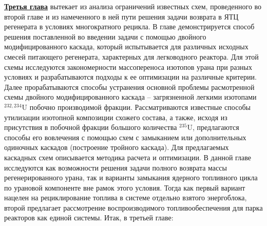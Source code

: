\underline{\textbf{Третья глава}} вытекает из анализа ограничений известных схем, проведенного во второй главе и из намеченного в ней пути решения задачи возврата в ЯТЦ регенерата в условиях многократного рецикла. В главе демонстрируется способ решения поставленной во введении задачи с помощью двойного модифицированного каскада, который испытывается для различных исходных смесей питающего регенерата, характерных для легководного реактора. Для этой схемы исследуются закономерности массопереноса изотопов урана при разных условиях и разрабатываются подходы к ее оптимизации на различные критерии. Далее прорабатываются способы устранения основной проблемы расмотренной схемы двойного модифицированного каскада -- загрязненной легкими изотопами $^{232,234}$U побочно производимой фракции. Рассматриваются известные способы утилизации изотопной композиции схожего состава, а также, исходя из присутствия в побочной фракции большого количества $^{235}$U, предлагаются способы его вовлечения с помощью схем с замыканием или дополнительных одиночных каскадов (построение тройного каскада). Для предлагаемых каскадных схем описывается методика расчета и оптимизации. В данной главе исследуются как возможности решения задачи полного возврата массы регенерированного урана, так и варианты замыкания ядерного топливного цикла по урановой компоненте вне рамок этого условия. Тогда как первый вариант нацелен на рециклирование топлива в системе отдельно взятого энергоблока, второй предлагает рассмотрение воспроизводимого топливообеспечения для парка реакторов как единой системы.
Итак, в третьей главе:
